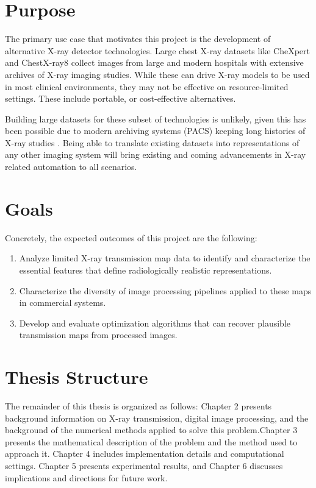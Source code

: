 \documentclass[nomenclature, english, bibtex]{kththesis}
\numberwithin{listing}{chapter}
\begin{document}
\section{Purpose}

The primary use case that motivates this project is the development of alternative X-ray detector technologies.
Large chest X-ray datasets like CheXpert \cite{chexpert} and ChestX-ray8 \cite{nih} collect images from large
and modern hospitals with extensive archives of X-ray imaging studies. While these can drive X-ray models to be
used in most clinical environments, they may not be effective on resource-limited settings. These include portable,
or cost-effective alternatives.

Building large datasets for these subset of technologies is unlikely, given this has been possible due to
modern archiving systems (PACS) keeping long histories of X-ray studies \cite[p.~3462]{nih}. Being able
to translate existing datasets into representations of any other imaging system will bring existing and
coming advancements in X-ray related automation to all scenarios.


\section{Goals}

Concretely, the expected outcomes of this project are the following:

\begin{enumerate}
    \item Analyze limited X-ray transmission map data to identify and characterize the essential features that define radiologically realistic representations.
    \item Characterize the diversity of image processing pipelines applied to these maps in commercial systems.
    \item Develop and evaluate optimization algorithms that can recover plausible transmission maps from processed images.
\end{enumerate}

\section{Thesis Structure}

The remainder of this thesis is organized as follows: Chapter 2 presents background information on X-ray transmission,
digital image processing, and the background of the numerical methods applied to solve this problem.Chapter 3
presents the mathematical description of the problem and the method used to approach it. Chapter 4 includes implementation
details and computational settings. Chapter 5 presents experimental results, and Chapter 6 discusses implications
and directions for future work.
\end{document}
